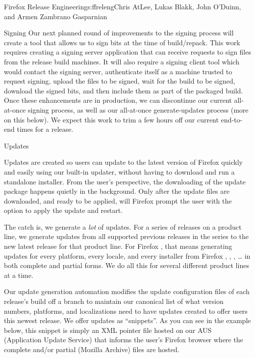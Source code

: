 \begin{aosachapter}{Firefox Release Engineering}{s:ffreleng}{Chris AtLee, Lukas Blakk, John O'Duinn, and Armen Zambrano Gasparnian}
\begin{aosasect1}{Signing}
Our next planned round of improvements to the signing process
will create a tool that allows us to sign bits at the time of
build/repack. This work requires creating a signing server
application that can receive requests to sign files from
the release build machines.  It will also
require a signing client tool which would contact the signing
server, authenticate itself as a machine trusted to request signing,
upload the files to be signed, wait for the build to be signed,
download the signed bits, and then include them as part of the
packaged build.  Once these enhancements are in production, we can
discontinue our current all-at-once signing process, as well as our
all-at-once generate-updates process (more on this below). We expect this
work to trim a few hours off our current end-to-end times for a
release.
  
\end{aosasect1}

\begin{aosasect1}{Updates}

Updates are created so users can update to the latest version of
Firefox quickly and easily using our built-in updater, without having
to download and run a standalone installer.
From the user's perspective, the downloading of the update
package happens quietly in the background. Only after the update files
are downloaded, and ready to be applied, will Firefox prompt the user
with the option to apply the update and restart.

The catch is, we generate a \emph{lot} of updates. For a series of releases on
a product line, we generate updates from all supported previous releases in the
series to the new latest release for that product line.  For Firefox
, that means generating updates for every platform, every locale,
and every installer from Firefox , ,
, {\ldots} in both complete and partial forms. We do all this
for several different product lines at a time.

Our update generation automation modifies the update configuration files
of each release's build off a branch to maintain our canonical list of
what version numbers, platforms, and localizations need to have
updates created to offer users this newest release. We offer updates
as ``snippets''. As you can see in the example below, this snippet is
simply an XML pointer file hosted on our AUS (Application Update
Service) that informs the user's Firefox browser where the complete
and/or partial  (Mozilla Archive) files are hosted.


\end{aosasect1}
\end{aosachapter}
